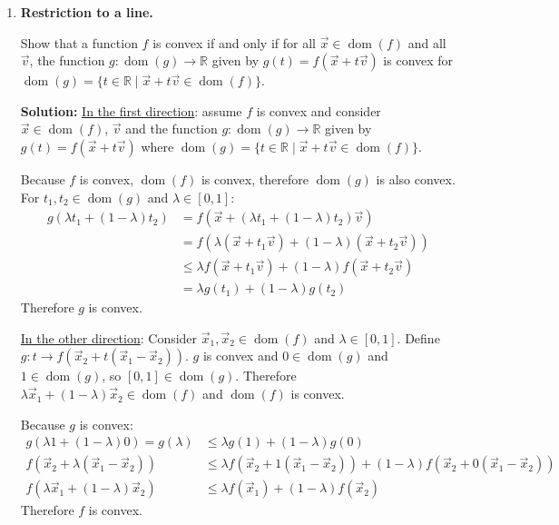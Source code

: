 \documentclass[10pt]{article}
\newcommand{\RR}{\mathbb{R}}
\DeclareMathOperator{\dom}{dom}
\begin{document}
\begin{enumerate}[label=(\alph*)]
    \item \textbf{Restriction to a line.}

    Show that a function $f$ is convex if and only if for all $\vec{x} \in \dom(f)$ and all $\vec{v}$, the function $g\colon \dom(g) \to \RR$ given by $g(t) = f(\vec{x} + t\vec{v})$ is convex for $\dom(g) = \{t \in \RR \mid \vec{x} + t\vec{v} \in \dom(f)\}$.

    \textbf{Solution:} \underline{In the first direction}: assume $f$ is convex and consider $\vec{x} \in \dom(f)$, $\vec{v}$ and the function $g\colon \dom(g) \to \RR$ given by $g(t) = f(\vec{x} + t\vec{v})$ where $\dom(g) = \{t \in \RR \mid \vec{x} + t\vec{v} \in \dom(f)\}$.

    Because $f$ is convex, $\dom(f)$ is convex, therefore $\dom(g)$ is also convex. For $t_1, t_2 \in \dom(g)$ and $\lambda \in [0,1]$:
    \begin{align}
        g(\lambda t_1 + (1-\lambda) t_2) &= f(\vec{x} + (\lambda t_1 + (1-\lambda) t_2)\vec{v}) \\
        &= f(\lambda(\vec{x} + t_1 \vec{v}) + (1-\lambda)(\vec{x} + t_2 \vec{v})) \\
        &\leq \lambda f(\vec{x} + t_1 \vec{v}) + (1-\lambda) f(\vec{x} + t_2 \vec{v}) \\
        &= \lambda g(t_1) + (1-\lambda) g(t_2)
    \end{align}
    Therefore $g$ is convex.

    \underline{In the other direction}: Consider $\vec{x}_1, \vec{x}_2 \in \dom(f)$ and $\lambda \in [0,1]$. Define $g\colon t \to f(\vec{x}_2 + t(\vec{x}_1 - \vec{x}_2))$. $g$ is convex and $0 \in \dom(g)$ and $1 \in \dom(g)$, so $[0,1] \in \dom(g)$. Therefore $\lambda \vec{x}_1 + (1-\lambda)\vec{x}_2 \in \dom(f)$ and $\dom(f)$ is convex.

    Because $g$ is convex:
    \begin{align}
        g(\lambda 1 + (1-\lambda)0) = g(\lambda) &\leq \lambda g(1) + (1-\lambda) g(0) \\
        f(\vec{x}_2 + \lambda(\vec{x}_1 - \vec{x}_2)) &\leq \lambda f(\vec{x}_2 + 1(\vec{x}_1 - \vec{x}_2)) + (1-\lambda) f(\vec{x}_2 + 0(\vec{x}_1 - \vec{x}_2)) \\
        f(\lambda \vec{x}_1 + (1-\lambda)\vec{x}_2) &\leq \lambda f(\vec{x}_1) + (1-\lambda) f(\vec{x}_2)
    \end{align}
    Therefore $f$ is convex.


\end{enumerate}
\end{document}
